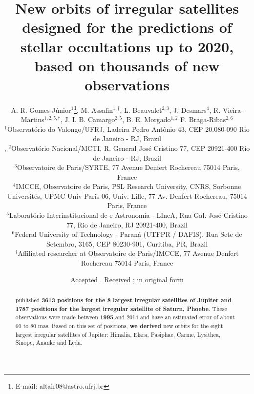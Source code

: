 \documentclass[useAMS,usenatbib]{mn2e}
\title[Orbits and predictions for occultations up to 2020]{New orbits of irregular satellites designed for the predictions of stellar occultations up to 2020, based on thousands of new observations}
\author[A. R. Gomes-J\'unior, M. Assafin, L. Beauvalet et al.]{A. R. Gomes-J\'unior$^{1}$\thanks{E-mail: altair08@astro.ufrj.br},
M. Assafin$^{1,\dag}$,
L. Beauvalet$^{2,3}$,
J. Desmars$^{4}$,\newauthor
R. Vieira-Martins$^{1,2,5,\dag}$,
J. I. B. Camargo$^{2,5}$,
B. E. Morgado$^{1,2}$
F. Braga-Ribas$^{2,6}$
\\
$^{1}$Observat\'orio do Valongo/UFRJ, Ladeira Pedro Ant\^onio 43,
CEP 20.080-090 Rio de Janeiro - RJ, Brazil\\,
$^{2}$Observat\'orio Nacional/MCTI, R. General Jos\'e Cristino 77, CEP 20921-400 Rio de Janeiro - RJ, Brazil\\
$^{3}$Observatoire de Paris/SYRTE, 77 Avenue Denfert Rochereau 75014 Paris, France\\
$^{4}$IMCCE, Observatoire de Paris, PSL Research University, CNRS, Sorbonne Universités, UPMC Univ Paris 06, Univ. Lille, 77 Av. Denfert-Rochereau, 75014 Paris, France\\
$^{5}$Laborat\'orio Interinstitucional de e-Astronomia - LIneA, Rua Gal. Jos\'e Cristino 77, Rio de Janeiro, RJ 20921-400, Brazil\\
$^{6}$Federal University of Technology - Paran\'a (UTFPR / DAFIS), Rua Sete de Setembro, 3165, CEP 80230-901, Curitiba, PR, Brazil\\
$^\dag$Affiliated researcher at Observatoire de Paris/IMCCE, 77 Avenue Denfert Rochereau 75014 Paris, France
}
\begin{document}
\newcommand{\noccs}{5442 } %

\date{Accepted . Received ; in original form }

\pagerange{\pageref{firstpage}--\pageref{lastpage}} 

\maketitle

\label{firstpage}

\begin{abstract}
\cite{GomesJunior2015} published \textbf{3613 positions for the 8 largest irregular satellites of Jupiter and 1787 positions for the largest irregular satellite of Saturn, Phoebe}.  These observations were made between \textbf{1995} and 2014 and have an estimated error of about 60 to 80 mas. Based on this set of positions, \textbf{we derived} new orbits for the eight largest irregular satellites of Jupiter: Himalia, Elara, Pasiphae, Carme, Lysithea, Sinope, Ananke and Leda. %

\end{abstract}
\end{document}

